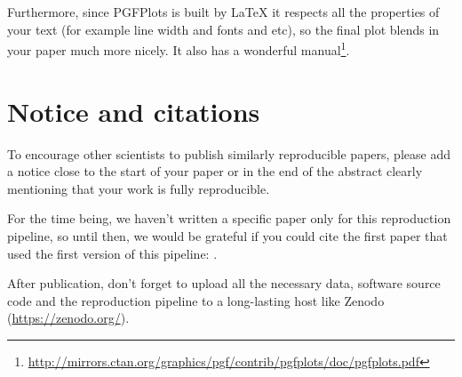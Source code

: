 \documentclass[twocolumn]{article}
\begin{document}
\begin{Figure}

\end{Figure}

Furthermore, since PGFPlots is built by \LaTeX{} it respects all the
properties of your text (for example line width and fonts and etc), so the
final plot blends in your paper much more nicely. It also has a wonderful
manual\footnote{\url{http://mirrors.ctan.org/graphics/pgf/contrib/pgfplots/doc/pgfplots.pdf}}.


\section{Notice and citations}
To encourage other scientists to publish similarly reproducible papers,
please add a notice close to the start of your paper or in the end of the
abstract clearly mentioning that your work is fully reproducible.

For the time being, we haven't written a specific paper only for this
reproduction pipeline, so until then, we would be grateful if you could
cite the first paper that used the first version of this pipeline:
\citet{ai15}.

After publication, don't forget to upload all the necessary data, software
source code and the reproduction pipeline to a long-lasting host like
Zenodo (\url{https://zenodo.org/}).



\printbibliography
\end{document}
